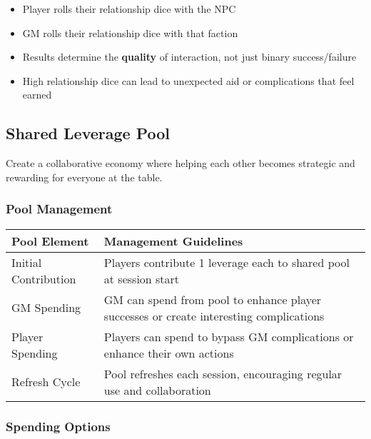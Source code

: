 \begin{itemize}
    \item Player rolls their relationship dice with the NPC
    \item GM rolls their relationship dice with that faction
    \item Results determine the \textbf{quality} of interaction, not just binary success/failure
    \item High relationship dice can lead to unexpected aid or complications that feel earned
\end{itemize}

\subsection*{Shared Leverage Pool}

Create a collaborative economy where helping each other becomes strategic and rewarding for everyone at the table.

\subsubsection*{Pool Management}

\begin{fatebox}
\begin{tabularx}{\textwidth}{lX}
\toprule
\textbf{Pool Element} & \textbf{Management Guidelines} \\
\midrule
Initial Contribution & Players contribute 1 leverage each to shared pool at session start \\
GM Spending & GM can spend from pool to enhance player successes or create interesting complications \\
Player Spending & Players can spend to bypass GM complications or enhance their own actions \\
Refresh Cycle & Pool refreshes each session, encouraging regular use and collaboration \\
\bottomrule
\end{tabularx}
\end{fatebox}

\subsubsection*{Spending Options}

